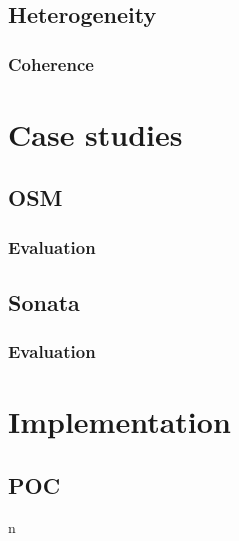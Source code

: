 \documentclass[12pt,twoside,doublepage]{article}
\begin{document}
\subsection{Heterogeneity}
\subsubsection{Coherence}

\section{Case studies}

\subsection{OSM}
\subsubsection{Evaluation}
\subsection{Sonata}
\subsubsection{Evaluation}

\section{Implementation}
\subsection{POC}n



\end{document}
